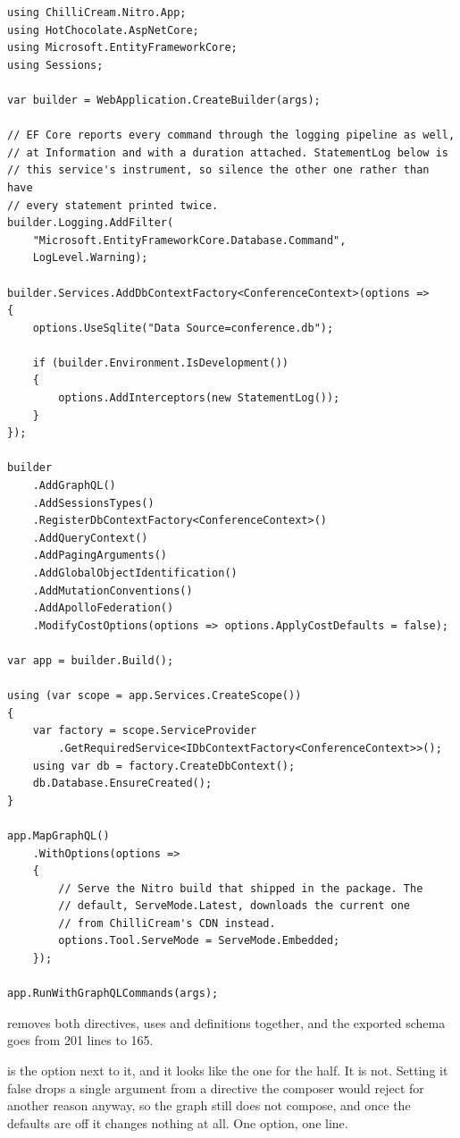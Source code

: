 \begin{verbatim}
using ChilliCream.Nitro.App;
using HotChocolate.AspNetCore;
using Microsoft.EntityFrameworkCore;
using Sessions;

var builder = WebApplication.CreateBuilder(args);

// EF Core reports every command through the logging pipeline as well,
// at Information and with a duration attached. StatementLog below is
// this service's instrument, so silence the other one rather than have
// every statement printed twice.
builder.Logging.AddFilter(
    "Microsoft.EntityFrameworkCore.Database.Command",
    LogLevel.Warning);

builder.Services.AddDbContextFactory<ConferenceContext>(options =>
{
    options.UseSqlite("Data Source=conference.db");

    if (builder.Environment.IsDevelopment())
    {
        options.AddInterceptors(new StatementLog());
    }
});

builder
    .AddGraphQL()
    .AddSessionsTypes()
    .RegisterDbContextFactory<ConferenceContext>()
    .AddQueryContext()
    .AddPagingArguments()
    .AddGlobalObjectIdentification()
    .AddMutationConventions()
    .AddApolloFederation()
    .ModifyCostOptions(options => options.ApplyCostDefaults = false);

var app = builder.Build();

using (var scope = app.Services.CreateScope())
{
    var factory = scope.ServiceProvider
        .GetRequiredService<IDbContextFactory<ConferenceContext>>();
    using var db = factory.CreateDbContext();
    db.Database.EnsureCreated();
}

app.MapGraphQL()
    .WithOptions(options =>
    {
        // Serve the Nitro build that shipped in the package. The
        // default, ServeMode.Latest, downloads the current one
        // from ChilliCream's CDN instead.
        options.Tool.ServeMode = ServeMode.Embedded;
    });

app.RunWithGraphQLCommands(args);
\end{verbatim}

%
 removes both directives, uses and definitions
together, and the exported schema goes from 201 lines to 165.

%
 is the option next to it, and it looks
like the one for the  half. It is not. Setting it false drops a
single argument from a directive the composer would reject for another reason
anyway, so the graph still does not compose, and once the defaults are off it
changes nothing at all. One option, one line.

